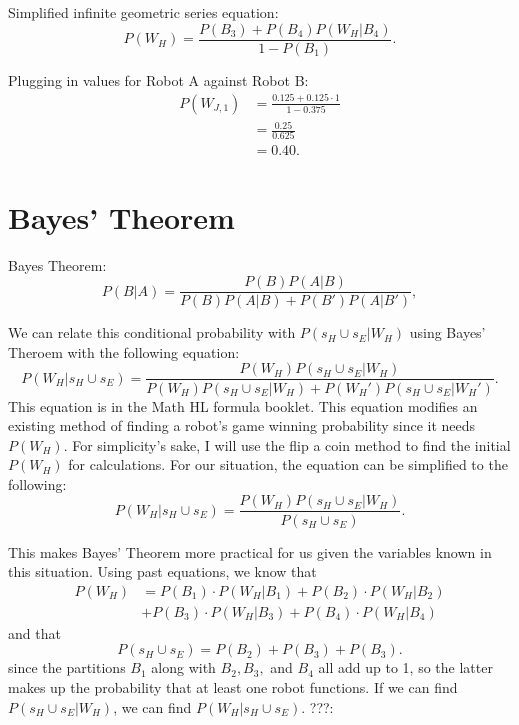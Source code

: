 \documentclass[11pt]{article}
\begin{document}
Simplified infinite geometric series equation:
\begin{equation*}
    P(W_{H}) = \frac{P(B_3) + P(B_4)P(W_H | B_4)}{1-P(B_1)}.
\end{equation*}

Plugging in values for Robot A against Robot B:
\begin{align*}
    P(W_{J,1}) &= \frac{0.125 + 0.125 \cdot 1}{1-0.375}\\
    &=\frac{0.25}{0.625}\\
    &=0.40.
\end{align*}


\section{Bayes' Theorem}
Bayes Theorem:
\begin{equation*}
    P(B | A) = \frac{P(B)P(A|B)}{P(B)P(A|B) + P(B')P(A|B')},
\end{equation*}

We can relate this conditional probability with \(P(s_H \cup s_E | W_H) \) using Bayes' Theroem with the following
equation:
\begin{equation*}
    P(W_H | s_H \cup s_E) = \frac{P(W_H) P(s_H \cup s_E | W_H)}{P(W_H) P(s_H \cup s_E | W_H) + P(W_H') P(s_H \cup s_E | W_H')}.
\end{equation*}
This equation is in the Math HL formula booklet. This equation modifies an existing method of finding
a robot's game winning probability since it needs \(P(W_H)\). For simplicity's sake, I will use the flip
a coin method to find the initial \(P(W_H)\) for calculations. For our situation, the equation can be 
simplified to the following:
\begin{equation*}
    P(W_H | s_H \cup s_E) = \frac{P(W_H) P(s_H \cup s_E | W_H)}{P(s_H \cup s_E)}.
\end{equation*}

This makes  Bayes' Theorem more practical for us given the variables known in this situation. Using past 
equations, we know that
\begin{align*}
    P(W_H) &=  P(B_{1}) \cdot P(W_{H} | B_{1}) + P(B_{2}) \cdot P(W_{H} | B_{2}) \\
    &+ P(B_{3}) \cdot P(W_{H} | B_{3}) + P(B_{4}) \cdot P(W_{H} | B_{4})
\end{align*}
and that
\begin{equation*}
    P(s_H \cup s_E) = P(B_2) + P(B_3) + P(B_3).
\end{equation*}
since the partitions \(B_1\) along with \(B_2, B_3,\) and \(B_4\) all add up to 1, so the latter makes up the probability that at least
one robot functions. If we can find \(P(s_H \cup s_E | W_H)\), we can find \(P(W_H | s_H \cup s_E)\). ???:
\end{document}
